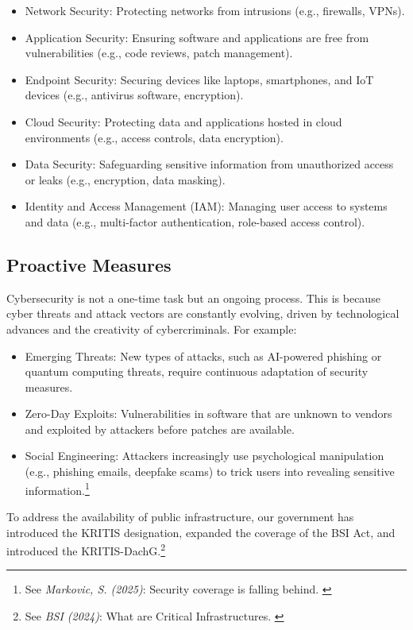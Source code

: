 \begin{itemize}
    \item Network Security: Protecting networks from intrusions (e.g., firewalls, VPNs).
    \item Application Security: Ensuring software and applications are free from vulnerabilities (e.g., code reviews, patch management).
    \item Endpoint Security: Securing devices like laptops, smartphones, and IoT devices (e.g., antivirus software, encryption).
    \item Cloud Security: Protecting data and applications hosted in cloud environments (e.g., access controls, data encryption).
    \item Data Security: Safeguarding sensitive information from unauthorized access or leaks (e.g., encryption, data masking).
    \item Identity and Access Management (IAM): Managing user access to systems and data (e.g., multi-factor authentication, role-based access control).
\end{itemize}

\subsection{Proactive Measures}

Cybersecurity is not a one-time task but an ongoing process. This is because cyber threats and attack vectors are constantly evolving, driven by technological advances and the creativity of cybercriminals. For example:

\begin{itemize}
    \item Emerging Threats: New types of attacks, such as AI-powered phishing or quantum computing threats, require continuous adaptation of security measures.
    \item Zero-Day Exploits: Vulnerabilities in software that are unknown to vendors and exploited by attackers before patches are available.
    \item Social Engineering: Attackers increasingly use psychological manipulation (e.g., phishing emails, deepfake scams) to trick users into revealing sensitive information.\footnote {See \textit{Markovic, S. (2025)}: Security coverage is falling behind. \cite{helpNet}}
\end{itemize}

To address the availability of public infrastructure, our government has introduced the KRITIS designation, expanded the coverage of the BSI Act, and introduced the KRITIS-DachG.\footnote {See \textit{BSI (2024)}: What are Critical Infrastructures. \cite{whatKritis}}

